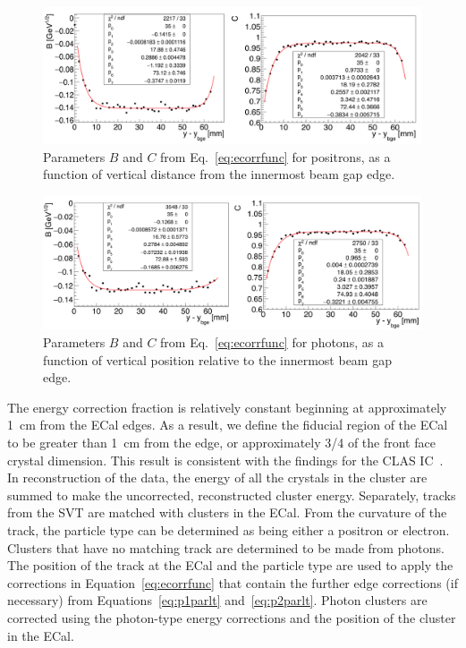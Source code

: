 \begin{figure}[htb]
  \centering
      \includegraphics[width=1.0\textwidth]{pics/performance/sfparEdge_ep.png}
  \caption[ECal energy shower parameters for positrons relative to the inside beam gap edge]{Parameters $B$ and $C$ from Eq.~\ref{eq:ecorrfunc} for positrons, as a function of vertical distance from the innermost beam gap edge.}
  \label{Figure:sfparEdgeEP}
\end{figure}

\begin{figure}[htb]
  \centering
      \includegraphics[width=1.0\textwidth]{pics/performance/sfparEdge_p.png}
  \caption[ECal energy shower parameters for photons relative to the inside beam gap edge]{Parameters $B$ and $C$ from Eq.~\ref{eq:ecorrfunc} for photons, as a function of vertical position
relative to the innermost beam gap edge.}
  \label{Figure:sfparEdgeP}
\end{figure}

The energy correction fraction is relatively constant beginning at approximately 1~cm from the ECal edges. As a result, we define the fiducial region of the ECal to be greater than 1~cm from the edge, or approximately 3/4 of the front face crystal dimension. This result is consistent with the findings for the CLAS IC~\cite{szumila-vance_hps_ecal_2014}.\\
\indent In reconstruction of the data, the energy of all the crystals in the cluster are summed to make the uncorrected, reconstructed cluster energy. Separately, tracks from the SVT are matched with clusters in the ECal. From the curvature of the track, the particle type can be determined as being either a positron or electron. Clusters that have no matching track are determined to be made from photons. The position of the track at the ECal and the particle type are used to apply the corrections in Equation~\eqref{eq:ecorrfunc} that contain the further edge corrections (if necessary) from Equations~\eqref{eq:p1parlt} and~\eqref{eq:p2parlt}. Photon clusters are corrected using the photon-type energy corrections and the position of the cluster in the ECal.  

